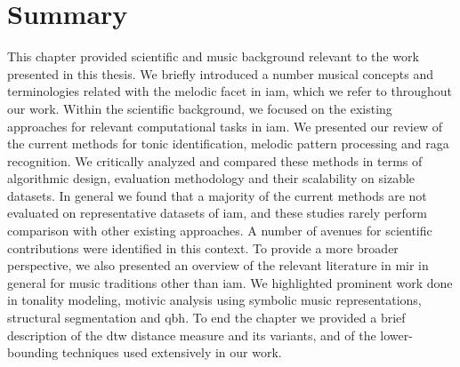 \section{Summary}
\label{sec:background_summary}


This chapter provided scientific and music background relevant to the work presented in this thesis. We briefly introduced a number musical concepts and terminologies related with the melodic facet in \gls{iam}, which we refer to throughout our work. Within the scientific background, we focused on the existing approaches for relevant computational tasks in \gls{iam}. We presented our review of the current methods for tonic identification, melodic pattern processing and \gls{raga} recognition. We critically analyzed and compared these methods in terms of algorithmic design, evaluation methodology and their scalability on sizable datasets. In general we found that a majority of the current methods are not evaluated on representative datasets of \gls{iam}, and these studies rarely perform comparison with other existing approaches. A number of avenues for scientific contributions were identified in this context. To provide a more broader perspective, we also presented an overview of the relevant literature in \gls{mir} in general for music traditions other than \gls{iam}. We highlighted prominent work done in tonality modeling, motivic analysis using symbolic music representations, structural segmentation and \gls{qbh}. To end the chapter we provided a brief description of the \gls{dtw} distance measure and its variants, and of the lower-bounding techniques used extensively in our work. 
